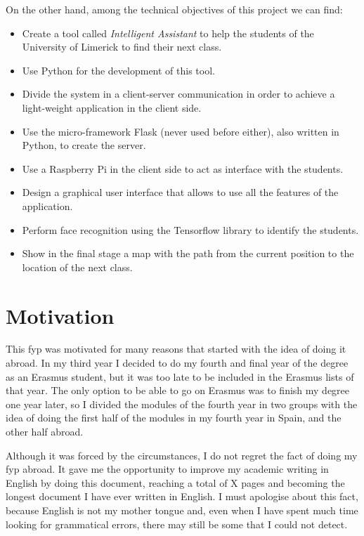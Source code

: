 On the other hand, among the technical objectives of this project we can find:
\begin{itemize}
	\item Create a tool called \textit{Intelligent Assistant} to help the students of the University of Limerick to find their next class.
	\item Use Python for the development of this tool.
	\item Divide the system in a client-server communication in order to achieve a light-weight application in the client side.
	\item Use the micro-framework Flask (never used before either), also written in Python, to create the server.
	\item Use a Raspberry Pi in the client side to act as interface with the students.
	\item Design a graphical user interface that allows to use all the features of the application.
	\item Perform face recognition using the Tensorflow library to identify the students.
	\item Show in the final stage a map with the path from the current position to the location of the next class.
\end{itemize}

\section{Motivation}
This \gls{fyp} was motivated for many reasons that started with the idea of doing it abroad. In my third year I decided to do my fourth and final year of the degree as an Erasmus student, but it was too late to be included in the Erasmus lists of that year. The only option to be able to go on Erasmus was to finish my degree one year later, so I divided the modules of the fourth year in two groups with the idea of doing the first half of the modules in my fourth year in Spain, and the other half abroad. 

Although it was forced by the circumstances, I do not regret the fact of doing my \gls{fyp} abroad. It gave me the opportunity to improve my academic writing in English by doing this document, reaching a total of X pages and becoming the longest document I have ever written in English. I must apologise about this fact, because English is not my mother tongue and, even when I have spent much time looking for grammatical errors, there may still be some that I could not detect.

